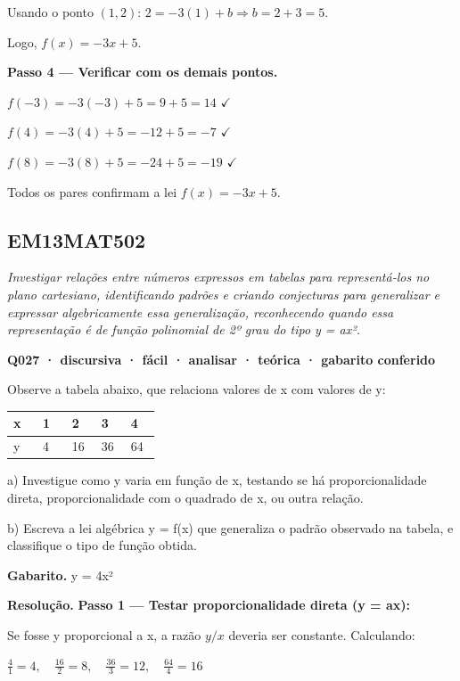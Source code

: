 \documentclass[11pt,a4paper]{article}
\begin{document}
Usando o ponto $(1,2)$: $2 = -3(1)+b \Rightarrow b = 2+3 = 5$.

Logo, $f(x) = -3x+5$.

\textbf{Passo 4 — Verificar com os demais pontos.}

$f(-3) = -3(-3)+5 = 9+5 = 14$ $\checkmark$

$f(4) = -3(4)+5 = -12+5 = -7$ $\checkmark$

$f(8) = -3(8)+5 = -24+5 = -19$ $\checkmark$

Todos os pares confirmam a lei $f(x) = -3x+5$.
\subsection*{EM13MAT502}
{\small\itshape Investigar relações entre números expressos em tabelas para representá-los no plano cartesiano, identificando padrões e criando conjecturas para generalizar e expressar algebricamente essa generalização, reconhecendo quando essa representação é de função polinomial de 2º grau do tipo y = ax².}

\bigskip\noindent\textbf{Q027 · discursiva · fácil · analisar · teórica · gabarito conferido}\par\nopagebreak
Observe a tabela abaixo, que relaciona valores de x com valores de y:

\begin{center}
\begin{tabular}{|p{0.172\linewidth}|p{0.172\linewidth}|p{0.172\linewidth}|p{0.172\linewidth}|p{0.172\linewidth}|}
\hline
\textbf{x} & \textbf{1} & \textbf{2} & \textbf{3} & \textbf{4} \\
\hline
y & 4 & 16 & 36 & 64 \\
\hline
\end{tabular}
\end{center}

a) Investigue como y varia em função de x, testando se há proporcionalidade direta, proporcionalidade com o quadrado de x, ou outra relação.

b) Escreva a lei algébrica y = f(x) que generaliza o padrão observado na tabela, e classifique o tipo de função obtida.

\textbf{Gabarito.} y = 4x²

\textbf{Resolução.} \textbf{Passo 1 — Testar proporcionalidade direta (y = ax):}

Se fosse y proporcional a x, a razão $y/x$ deveria ser constante. Calculando:

$\frac{4}{1}=4,\quad \frac{16}{2}=8,\quad \frac{36}{3}=12,\quad \frac{64}{4}=16$
\end{document}

